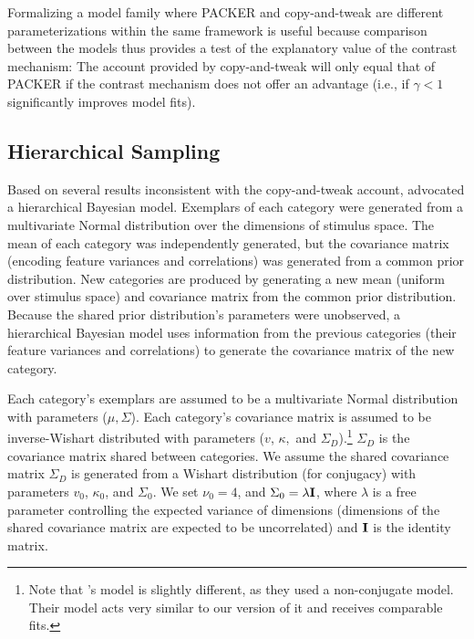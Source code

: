 \documentclass[10pt,letterpaper]{article}
\begin{document}
Formalizing a model family where PACKER and copy-and-tweak are different parameterizations within the same framework is useful because comparison between the models thus provides a test of the explanatory value of the contrast mechanism: The account provided by copy-and-tweak will only equal that of PACKER if the contrast mechanism does not offer an advantage (i.e., if $\gamma < 1$ significantly improves model fits).



\subsection{Hierarchical Sampling}

Based on several results inconsistent with the copy-and-tweak account, \citet{jern2013probabilistic} advocated a hierarchical Bayesian model. Exemplars of each category were generated from a multivariate Normal distribution over the dimensions of stimulus space. The mean of each category was independently generated, but the covariance matrix (encoding feature variances and correlations) was generated from a common prior distribution. New categories are produced by generating a new mean (uniform over stimulus space) and covariance matrix from the common prior distribution. Because the shared prior distribution's parameters were unobserved, a hierarchical Bayesian model uses information from the previous categories (their feature variances and correlations) to generate the covariance matrix of the new category.

Each category's exemplars are assumed to be a multivariate Normal distribution with parameters ($\mu, \Sigma$). Each category's covariance matrix is assumed to be inverse-Wishart distributed with parameters ($v$, $\kappa,$ and $\Sigma_D$).\footnote{Note that \citet{jern2013probabilistic}'s model is slightly different, as they used a non-conjugate model. Their model acts very similar to our version of it and receives comparable fits.} $\Sigma_D$ is the covariance matrix shared between categories. We assume the shared covariance matrix $\Sigma_D$ is generated from a Wishart distribution (for conjugacy) with parameters $v_0$, $\kappa_0$, and $\Sigma_0$. We set $\nu_0 = 4$, and $\Sigma_0 = \lambda {\bf I}$, where $\lambda$ is a free parameter controlling the expected variance of dimensions (dimensions of the shared covariance matrix are expected to be uncorrelated) and ${\bf I}$ is the identity matrix.
\end{document}
